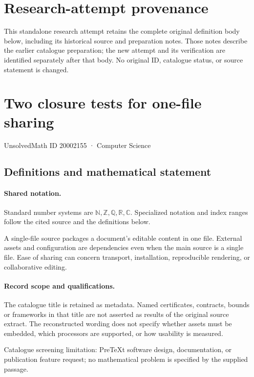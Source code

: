 \documentclass[11pt]{article}
\begin{document}
\section*{Research-attempt provenance}
This standalone research attempt retains the complete original definition body below,
including its historical source and preparation notes. Those notes describe the
earlier catalogue preparation; the new attempt and its verification are identified
separately after that body. No original ID, catalogue status, or source statement is changed.

\section{Two closure tests for one-file sharing}\label{20002155}
{\small UnsolvedMath ID 20002155 · Computer Science}
\subsection{Definitions and mathematical statement}

\paragraph{Shared notation.}Standard number systems are $\mathbb N,\mathbb Z,\mathbb Q,\mathbb R,\mathbb C$. Specialized notation and index ranges follow the cited source and the definitions below.


A single-file source packages a document's editable content in one file. External assets and configuration are dependencies even when the main source is a single file. Ease of sharing can concern transport, installation, reproducible rendering, or collaborative editing.
\paragraph{Record scope and qualifications.}
The catalogue title is retained as metadata. Named certificates, contracts, bounds or frameworks in that title are not asserted as results of the original source extract.
The reconstructed wording does not specify whether assets must be embedded, which processors are supported, or how usability is measured.

Catalogue screening limitation: PreTeXt software design, documentation, or publication feature request; no mathematical problem is specified by the supplied passage.
\end{document}
